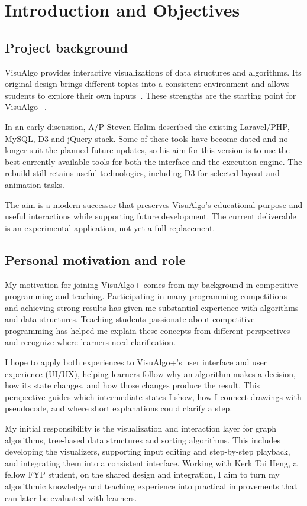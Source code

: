 \documentclass[11pt,a4paper]{article}
\begin{document}
\begingroup
\setlength{\parskip}{4pt}
\linespread{1.0}\selectfont
\section{Introduction and Objectives}
\subsection{Project background}
VisuAlgo provides interactive visualizations of data structures and algorithms. Its original design brings different topics into a consistent environment and allows students to explore their own inputs~\cite{halim2012}. These strengths are the starting point for VisuAlgo+.

In an early discussion, A/P Steven Halim described the existing Laravel/PHP, MySQL, D3 and jQuery stack. Some of these tools have become dated and no longer suit the planned future updates, so his aim for this version is to use the best currently available tools for both the interface and the execution engine. The rebuild still retains useful technologies, including D3 for selected layout and animation tasks.

The aim is a modern successor that preserves VisuAlgo's educational purpose and useful interactions while supporting future development. The current deliverable is an experimental application, not yet a full replacement.

\subsection{Personal motivation and role}
My motivation for joining VisuAlgo+ comes from my background in competitive programming and teaching. Participating in many programming competitions and achieving strong results has given me substantial experience with algorithms and data structures. Teaching students passionate about competitive programming has helped me explain these concepts from different perspectives and recognize where learners need clarification.

I hope to apply both experiences to VisuAlgo+'s user interface and user experience (UI/UX), helping learners follow why an algorithm makes a decision, how its state changes, and how those changes produce the result. This perspective guides which intermediate states I show, how I connect drawings with pseudocode, and where short explanations could clarify a step.

My initial responsibility is the visualization and interaction layer for graph algorithms, tree-based data structures and sorting algorithms. This includes developing the visualizers, supporting input editing and step-by-step playback, and integrating them into a consistent interface. Working with Kerk Tai Heng, a fellow FYP student, on the shared design and integration, I aim to turn my algorithmic knowledge and teaching experience into practical improvements that can later be evaluated with learners.
\end{document}
